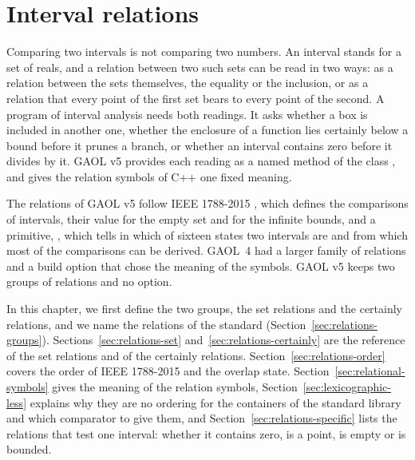 \chapter{Interval relations}\label{chap:relations}

Comparing two intervals is not comparing two numbers. An interval stands for
a set of reals, and a relation between two such sets can be read in two ways:
as a relation between the sets themselves, the equality or the inclusion, or
as a relation that every point of the first set bears to every point of the
second. A program of interval analysis needs both readings. It asks whether a
box is included in another one, whether the enclosure of a function lies
certainly below a bound before it prunes a branch, or whether an interval
contains zero before it divides by it. GAOL v5 provides each reading as a
named method of the class , and gives the relation symbols of
C++ one fixed meaning.

\medskip
The relations of GAOL v5 follow IEEE 1788-2015 \cite{IEEE1788:2015}, which
defines the comparisons of intervals, their value for the empty set and for
the infinite bounds, and a primitive, , which tells in which of
sixteen states two intervals are and from which most of the comparisons can be
derived. GAOL~4 had a larger family of relations and a
build option that chose the meaning of the symbols. GAOL v5 keeps two groups
of relations and no option.

\medskip
In this chapter, we first define the two groups, the set relations and the
certainly relations, and we name the relations of the standard
(Section~\ref{sec:relations-groups}). Sections~\ref{sec:relations-set}
and~\ref{sec:relations-certainly} are the reference of the set relations and
of the certainly relations. Section~\ref{sec:relations-order} covers the
order of IEEE 1788-2015 and the overlap state.
Section~\ref{sec:relational-symbols} gives the meaning of the relation
symbols, Section~\ref{sec:lexicographic-less} explains why they are no
ordering for the containers of the standard library and which comparator to
give them, and Section~\ref{sec:relations-specific} lists the relations that
test one interval: whether it contains zero, is a point, is empty or is
bounded.

